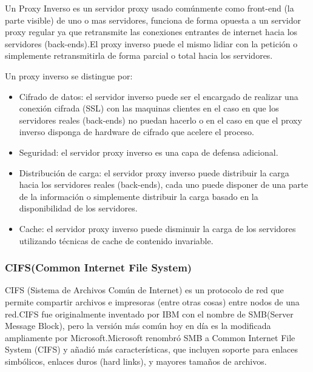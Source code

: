 Un Proxy Inverso es un servidor proxy usado comúnmente como front-end (la parte visible) de uno o mas servidores, funciona de forma opuesta a un servidor proxy regular ya que retransmite las conexiones entrantes de internet hacia los servidores (back-ends).\newline El proxy inverso puede el mismo lidiar con la petición o simplemente retransmitirla de forma parcial o total hacia los servidores.

Un proxy inverso se distingue por:

\begin{itemize}

	\item Cifrado de datos: el servidor inverso puede ser el encargado de realizar una conexión cifrada (SSL) con las maquinas clientes en el caso en que los servidores reales (back-ends) no puedan hacerlo o en el caso en que el proxy inverso disponga de hardware de cifrado que acelere el proceso.
	
	\item Seguridad: el servidor proxy inverso es una capa de defensa adicional.
	
	\item Distribución de carga: el servidor proxy inverso puede distribuir la carga	hacia los servidores reales (back-ends), cada uno puede disponer de una parte de la información o simplemente distribuir la carga basado en la disponibilidad de los servidores.
	
	\item Cache: el servidor proxy inverso puede disminuir la carga de los servidores utilizando técnicas de cache de contenido invariable.

\end{itemize}


\subsubsection*{CIFS(Common Internet File System)}

CIFS (Sistema de Archivos Común de Internet) es un protocolo de red que permite compartir archivos e impresoras (entre otras cosas) entre nodos de una red.\newline CIFS fue originalmente inventado por IBM con el nombre de SMB(Server Message Block), pero la versión más común hoy en día es la modificada ampliamente por Microsoft.\newline  Microsoft renombró SMB a Common Internet File System (CIFS) y añadió más características, que incluyen soporte para enlaces simbólicos, enlaces duros (hard links), y mayores tamaños de archivos.


